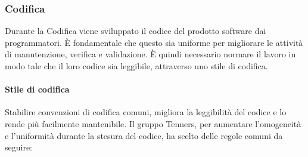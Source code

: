 \subsubsection{Codifica}
Durante la Codifica viene sviluppato il codice del prodotto software dai programmatori. È fondamentale che questo sia uniforme per migliorare le attività di manutenzione, verifica e validazione. È quindi necessario normare il lavoro in modo tale che il loro codice sia leggibile, attraverso uno stile di codifica.
\paragraph{Stile di codifica}
Stabilire convenzioni di codifica comuni, migliora la leggibilità del codice e lo rende più facilmente mantenibile. Il gruppo Tenners, per aumentare l'omogeneità e l'uniformità durante la stesura del codice, ha scelto delle regole comuni da seguire:
